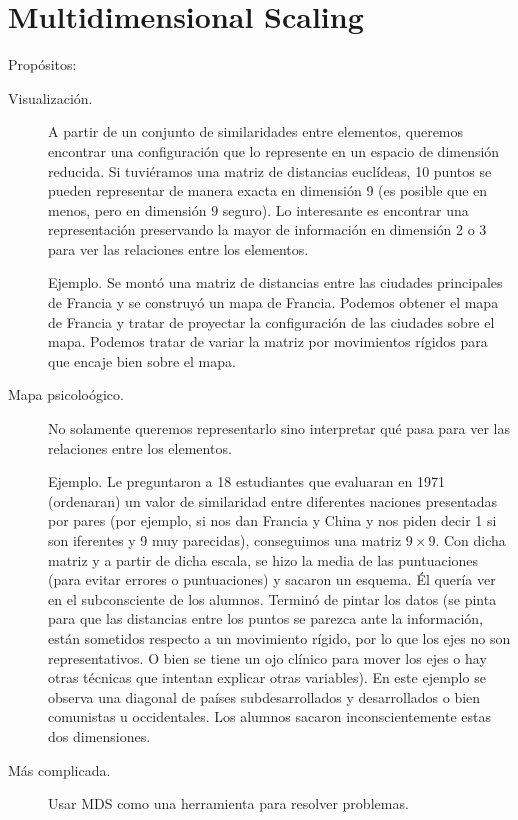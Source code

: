 \chapter{Multidimensional Scaling}


Propósitos:
\begin{description}
    \item [Visualización.] A partir de un conjunto de similaridades entre elementos, queremos encontrar una configuración que lo represente en un espacio de dimensión reducida. Si tuviéramos una matriz de distancias euclídeas, 10 puntos se pueden representar de manera exacta en dimensión 9 (es posible que en menos, pero en dimensión 9 seguro). Lo interesante es encontrar una representación preservando la mayor de información en dimensión 2 o 3 para ver las relaciones entre los elementos.

        Ejemplo. Se montó una matriz de distancias entre las ciudades principales de Francia y se construyó un mapa de Francia. Podemos obtener el mapa de Francia y tratar de proyectar la configuración de las ciudades sobre el mapa. Podemos tratar de variar la matriz por movimientos rígidos para que encaje bien sobre el mapa.
    \item [Mapa psicoloógico.] No solamente queremos representarlo sino interpretar qué pasa para ver las relaciones entre los elementos.

        Ejemplo. Le preguntaron a 18 estudiantes que evaluaran en 1971 (ordenaran) un valor de similaridad entre diferentes naciones presentadas por pares (por ejemplo, si nos dan Francia y China y nos piden decir 1 si son iferentes y 9 muy parecidas), conseguimos una matriz $9\times 9$. Con dicha matriz y a partir de dicha escala, se hizo la media de las puntuaciones (para evitar errores o puntuaciones) y sacaron un esquema. Él quería ver en el subconsciente de los alumnos. Terminó de pintar los datos (se pinta para que las distancias entre los puntos se parezca ante la información, están sometidos respecto a un movimiento rígido, por lo que los ejes no son representativos. O bien se tiene un ojo clínico para mover los ejes o hay otras técnicas que intentan explicar otras variables). En este ejemplo se observa una diagonal de países subdesarrollados y desarrollados o bien comunistas u occidentales. Los alumnos sacaron inconscientemente estas dos dimensiones.
    \item [Más complicada.] Usar MDS como una herramienta para resolver problemas.


\end{description}
